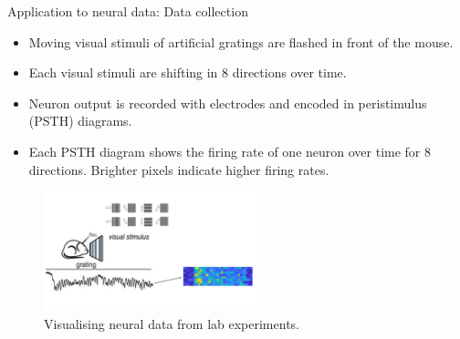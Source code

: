 \documentclass[xcolor={dvipsnames,svgnames}]{beamer}
\begin{document}
\begin{frame}{Application to neural data: Data collection}
 \begin{itemize}
        \item Moving visual stimuli of artificial gratings are flashed in front of the mouse.
        \item Each visual stimuli are shifting in 8 directions over time.
        \item Neuron output is recorded with electrodes and encoded in peristimulus (PSTH) diagrams.
        \item Each PSTH diagram shows the firing rate of one neuron over time for 8 directions. Brighter pixels indicate higher firing rates.
    \end{itemize} 
 \begin{figure}[H]
        \centering
            \includegraphics[width=0.55\textwidth]{figures/Slide5.jpg}
            \caption{Visualising neural data from lab experiments.}
    \end{figure}
\end{frame}
\end{document}
